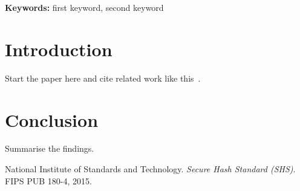 \documentclass[11pt,a4paper]{article}
\title{\papertitle}
\author{
  First Author\\ \small AI Explain
  \and
  Second Author\\ \small Affiliation
}
\date{}
\begin{document}
\maketitle
\thispagestyle{fancy}

\begin{abstract}
Write the abstract here. Use the same text as the abstract in paper.yaml.
\end{abstract}

\noindent\textbf{Keywords:} first keyword, second keyword

\section{Introduction}

Start the paper here and cite related work like this~\cite{fips180}.

\section{Conclusion}

Summarise the findings.

\begin{thebibliography}{9}

National Institute of Standards and Technology.
\newblock \emph{Secure Hash Standard (SHS)}.
\newblock FIPS PUB 180-4, 2015.

\end{thebibliography}
\end{document}
